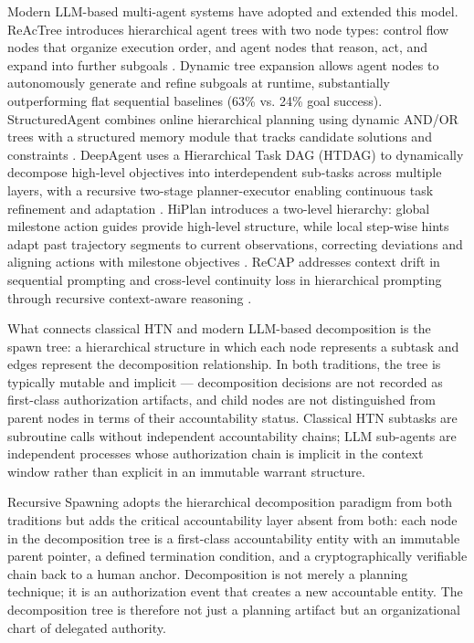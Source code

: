 Modern LLM-based multi-agent systems have adopted and extended this model. ReAcTree introduces hierarchical agent trees with two node types: control flow nodes that organize execution order, and agent nodes that reason, act, and expand into further subgoals \cite{reactree2025}. Dynamic tree expansion allows agent nodes to autonomously generate and refine subgoals at runtime, substantially outperforming flat sequential baselines (63\% vs. 24\% goal success). StructuredAgent combines online hierarchical planning using dynamic AND/OR trees with a structured memory module that tracks candidate solutions and constraints \cite{structuredagent2025}. DeepAgent uses a Hierarchical Task DAG (HTDAG) to dynamically decompose high-level objectives into interdependent sub-tasks across multiple layers, with a recursive two-stage planner-executor enabling continuous task refinement and adaptation \cite{deepagent2025}. HiPlan introduces a two-level hierarchy: global milestone action guides provide high-level structure, while local step-wise hints adapt past trajectory segments to current observations, correcting deviations and aligning actions with milestone objectives \cite{hiplan2025}. ReCAP addresses context drift in sequential prompting and cross-level continuity loss in hierarchical prompting through recursive context-aware reasoning \cite{recap2025}.

What connects classical HTN and modern LLM-based decomposition is the spawn tree: a hierarchical structure in which each node represents a subtask and edges represent the decomposition relationship. In both traditions, the tree is typically mutable and implicit — decomposition decisions are not recorded as first-class authorization artifacts, and child nodes are not distinguished from parent nodes in terms of their accountability status. Classical HTN subtasks are subroutine calls without independent accountability chains; LLM sub-agents are independent processes whose authorization chain is implicit in the context window rather than explicit in an immutable warrant structure.

Recursive Spawning adopts the hierarchical decomposition paradigm from both traditions but adds the critical accountability layer absent from both: each node in the decomposition tree is a first-class accountability entity with an immutable parent pointer, a defined termination condition, and a cryptographically verifiable chain back to a human anchor. Decomposition is not merely a planning technique; it is an authorization event that creates a new accountable entity. The decomposition tree is therefore not just a planning artifact but an organizational chart of delegated authority.

